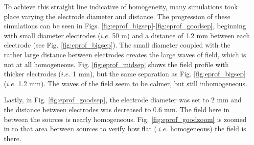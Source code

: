To achieve this straight line indicative of homogeneity, many simulations took place varying the electrode diameter and distance. The progression of these simulations can be seen in Figs. \ref{fig:eprof_bigsep}-\ref{fig:eprof_goodsep}, beginning with small diameter electrodes ($i.e.$ 50 \textmu m) and a distance of 1.2 mm between each electrode (see Fig. \ref{fig:eprof_bigsep}). The small diameter coupled with the rather large distance between electrodes creates the large waves of field, which is not at all homogeneous. Fig. \ref{fig:eprof_midsep} shows the field profile with thicker electrodes ($i.e.$ 1 mm), but the same separation as Fig. \ref{fig:eprof_bigsep} ($i.e.$ 1.2 mm). The waves of the field seem to be calmer, but still inhomogeneous.

Lastly, in Fig. \ref{fig:eprof_goodsep}, the electrode diameter was set to 2 mm and the distance between electrodes was decreased to 0.6 mm. The field here in between the sources is nearly homogeneous. Fig. \ref{fig:eprof_goodzoom} is zoomed in to that area between sources to verify how flat ($.i.e.$ homogeneous) the field is there.

